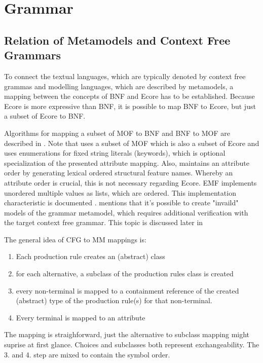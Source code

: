 \chapter{Grammar}
\label{cha:grammar}


\section{Relation of Metamodels and Context Free Grammars}
To connect the textual languages, which are typically denoted by context free grammas and modelling languages, which are described by metamodels, a mapping between the concepts of BNF and Ecore has to be established. Because Ecore is more expressive than BNF, it is possible to map BNF to Ecore, but just a subset of Ecore to BNF.

Algorithms for mapping a subset of MOF to BNF and BNF to MOF are described in \cite{MofCfg}. Note that \cite{MofCfg} uses a subset of MOF which is also a subset of Ecore and uses enumerations for fixed string literals (keywords), which is optional specialization of the presented attribute mapping. Also,  \cite{MofCfg} maintains an attribute order by generating lexical ordered structural feature names. Whereby an attribute order is crucial, this is not necessary regarding Ecore. EMF implements unordered multiple values as lists, which are ordered. This implementation characteristic is documented \cite{EMF2nd}.  \cite{MofCfg} mentions that it's possible to create "invaild" models of the grammar metamodel, which requires additional verification with the target context free grammar. This topic is discussed later in 

The general idea of CFG to MM mappings is:
\begin{enumerate}
	\item Each production rule creates an (abstract) class
	\item for each alternative,  a subclass of the production rules class is created
	\item every non-terminal is mapped to a containment reference of the created (abstract) type of the production rule(s) for that non-terminal.
	\item Every terminal is mapped to an attribute
\end{enumerate}

The mapping is straighforward, just the alternative to subclass mapping might suprise at first glance. Choices and subclasses both represent exchangeability. The 3. and 4. step are mixed to contain the symbol order.

